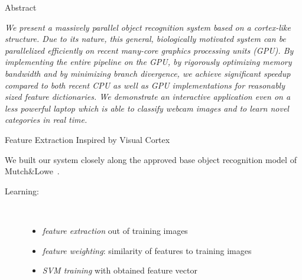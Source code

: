 \documentclass[final]{beamer}
\title[]{}
\author[]{Helmut Sedding and Ferdinand Deger}
\institute[]{Institute of Media Informatics, University Ulm}
\date{Jul. 31th, 2007}
\begin{document}
  \begin{frame}{}
  
    \begin{columns}[t]
        \begin{column}{.48\linewidth}
            \begin{block}{Abstract}

\emph{We present a massively parallel object recognition system based on a cortex-like structure. Due to its nature, this general, biologically motivated system can be parallelized efficiently on recent many-core graphics processing units (GPU). By implementing the entire pipeline on the GPU, by rigorously optimizing memory bandwidth and by minimizing branch divergence, we achieve significant speedup compared to both recent CPU as well as GPU implementations for reasonably sized feature dictionaries. We demonstrate an interactive application even on a less powerful laptop which is able to classify webcam images and to learn novel categories in real time.
}\newline
        \end{block}
        
        \begin{block} {Feature Extraction Inspired by Visual Cortex}
        
We built our system closely along the approved base object recognition model of
Mutch\&Lowe~\cite{mutch06}.

\begin{description}

\item[Learning:]~
\begin{itemize}
	\item  \emph{feature extraction} out of training images
	\item  \emph{feature weighting}: similarity of features to training images
	\item  \emph{SVM training} with obtained feature vector
\end{itemize}



\end{description}
\end{block}
\end{column}
\end{columns}
\end{frame}
\end{document}
